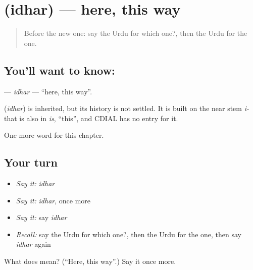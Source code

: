 \section[\texorpdfstring{\ur{ادھر} (idhar)}{ادھر (idhar)}]{ (idhar) — here, this way}

\label{lesson:UR-C90-idhar}



\begin{quote}
Before the new one: say the Urdu for which one?, then the Urdu for the one.
\end{quote}

\subsection*{You'll want to know: }
\textbf{} — \emph{idhar} — \textquotedblleft{}here, this way\textquotedblright{}.

\begin{cousinweb}
\textbf{} (\emph{idhar}) is inherited, but its history is not settled. It is built on the near stem \emph{i-} that is also in \emph{is}, \textquotedblleft{}this\textquotedblright{}, and CDIAL has no entry for it.
\end{cousinweb}

\begin{grammarlens}[title={What you've built}]
One more word for this chapter.
\end{grammarlens}

\subsection*{Your turn}
\begin{itemize}
\raggedright
  \item \emph{Say it:} \emph{idhar}
  \item \emph{Say it:} \emph{idhar}, once more
  \item \emph{Say it:} say \emph{idhar}
  \item \emph{Recall:} say the Urdu for which one?, then the Urdu for the one, then say \emph{idhar} again
\end{itemize}

\begin{tcolorbox}[breakable,colback=teal!4,colframe=teal!35!black,title={Before you move on}]
What does  mean? (\textquotedblleft{}Here, this way\textquotedblright{}.) Say it once more.
\end{tcolorbox}
